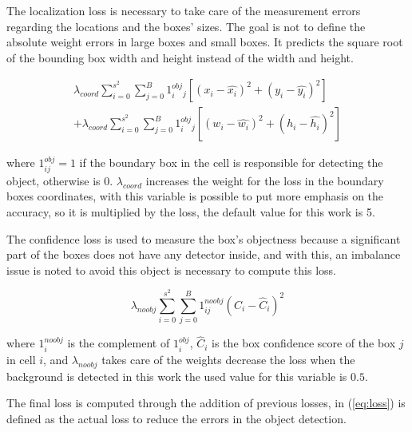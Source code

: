 The localization loss is necessary to take care of the measurement errors regarding the locations and the boxes' sizes. The goal is not to define the absolute weight errors in large boxes and small boxes. It predicts the square root of the bounding box width and height instead of the width and height. 

\begin{equation}
\label{eq:localization_loss}
\begin{aligned}
    \lambda_{coord}\sum_{i=0}^{s^2}\sum_{j=0}^{B}1^{obj}_i_j\left [ \left ( x_i - \hat{x_i} \right )^2  + (y_i-\hat{y_i})^2 \right ] \\ 
    + \lambda_{coord}\sum_{i=0}^{s^2}\sum_{j=0}^{B}1^{obj}_i_j\left [ \left ( w_i - \hat{w_i} \right )^2  + (h_i-\hat{h_i})^2 \right ] 
    \end{aligned}
\end{equation}

where $1_{ij}^{obj} = 1$ if the boundary box in the cell is responsible for detecting the object, otherwise is 0. $\lambda_{coord}$ increases the weight for the loss in the boundary boxes coordinates, with this variable is possible to put more emphasis on the accuracy, so it is multiplied by the loss, the default value for this work is 5. 

The confidence loss is used to measure the box's objectness because a significant part of the boxes does not have any detector inside, and with this, an imbalance issue is noted to avoid this object is necessary to compute this loss. 

\begin{equation}
    \label{eq:confidence_loss}
    \lambda_{noobj}\sum_{i=0}^{s^2}\sum_{j=0}^{B}1^{noobj}_{ij}\left ( C_i - \hat{C}_i \right )^2
\end{equation}

where $1^{noobj}_i$ is the complement of $1^{obj}_i$, $\hat{C}_i$ is the box confidence score of the box $j$ in cell $i$, and $\lambda_{noobj}$ takes care of the weights decrease the loss when the background is detected in this work the used value for this variable is $0.5$. 

The final loss is computed through the addition of previous losses, in (\ref{eq:loss}) is defined as the actual loss to reduce the errors in the object detection.

